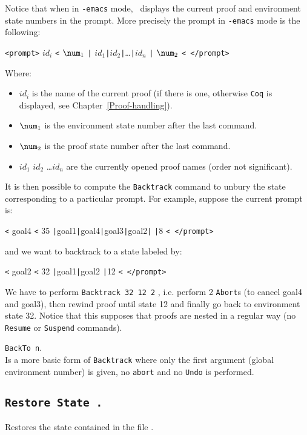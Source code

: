 Notice that when in \texttt{-emacs} mode, \Coq\ displays the current
proof and environment state numbers in the prompt. More precisely the
prompt in \texttt{-emacs} mode is the following:

\verb!<prompt>! \emph{$id_i$} \verb!<! $\num_1$
\verb!|! $id_1$\verb!|!$id_2$\verb!|!\dots\verb!|!$id_n$
\verb!|! $\num_2$ \verb!< </prompt>!

Where:

\begin{itemize}
\item \emph{$id_i$} is the name of the current proof (if there is
  one, otherwise \texttt{Coq} is displayed, see
Chapter~\ref{Proof-handling}).
\item $\num_1$ is the environment state number after the last
  command.
\item $\num_2$ is the proof state number after the last
  command.
\item $id_1$ $id_2$ \dots $id_n$ are the currently opened proof names
  (order not significant).
\end{itemize}

It is then possible to compute the \texttt{Backtrack} command to
unbury the state corresponding to a particular prompt. For example,
suppose the current prompt is:

\verb!<! goal4 \verb!<! 35
\verb!|!goal1\verb!|!goal4\verb!|!goal3\verb!|!goal2\verb!|! 
\verb!|!8 \verb!< </prompt>!

and we want to backtrack to a state labeled by:

\verb!<! goal2 \verb!<! 32
\verb!|!goal1\verb!|!goal2
\verb!|!12 \verb!< </prompt>!

We have to perform \verb!Backtrack 32 12 2! , i.e. perform 2
\texttt{Abort}s (to cancel goal4 and goal3), then rewind proof until
state 12 and finally go back to environment state 32. Notice that this
supposes that proofs are nested in a regular way (no \texttt{Resume} or
\texttt{Suspend} commands).

\begin{Variants}
\item {\tt BackTo n}. \\
  Is a more basic form of \texttt{Backtrack} where only the first
  argument (global environment number) is given, no \texttt{abort} and
  no \texttt{Undo} is performed.
\end{Variants}

\subsection[\tt Restore State \str.]{\tt Restore State \str.}
  Restores the state contained in the file \str.

